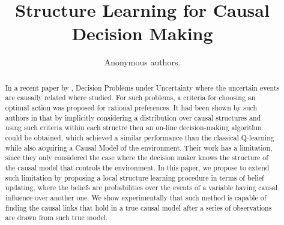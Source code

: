 \documentclass[letterpaper]{article}
\title{Structure Learning for Causal Decision Making}
\author{Anonymous authors.} %
\begin{document}
\maketitle

\begin{abstract}
In a recent paper by \cite{2019arXiv190202279G}, Decision Problems under Uncertainty where the uncertain events are causally related where studied. For such problems, a criteria for choosing an optimal action was proposed for rational preferences. It had been shown by such authors in \cite{gonzalez2018playing} that by implicitly considering a distribution over causal structures and using such criteria within each structre then an on-line decision-making algorithm could be obtained, which achieved a similar performance than the classical Q-learning while also acquiring a Causal Model of the environment. Their work has a limitation, since they only considered the case where the decision maker knows the structure of the causal model that controls the environment. In this paper, we propose to extend such limitation by proposing a local structure learning procedure in terms of belief updating, where the beliefs are probabilities over the events of a variable having causal influence over another one.  We show experimentally that such method is capable of finding the causal links that hold in a true causal model after a series of observations are drawn from such true model. 
\end{abstract}
\end{document}
